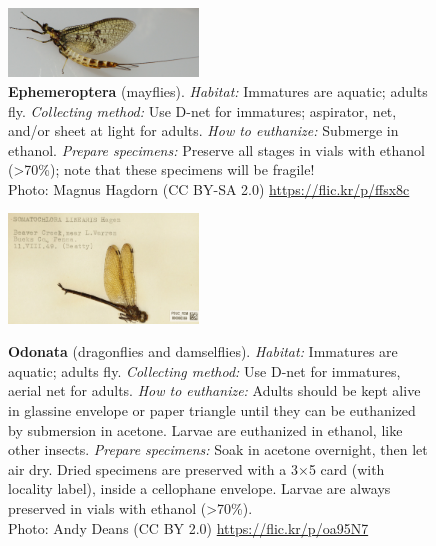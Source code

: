 \documentclass[letterpaper, 11pt]{article}
\begin{document}
\begin{figure}
  \caption*{\textbf{Ephemeroptera} (mayflies). \textit{Habitat:} Immatures are aquatic; adults fly. \textit{Collecting method:} Use D-net for immatures; aspirator, net, and/or sheet at light for adults. \textit{How to euthanize:} Submerge in ethanol. \textit{Prepare specimens:} Preserve all stages in vials with ethanol (\textgreater70\%); note that these specimens will be fragile!\\ Photo: Magnus Hagdorn (CC BY-SA 2.0) \url{https://flic.kr/p/ffsx8c}}
  \includegraphics[width=0.45\textwidth]{Ephemeroptera}
\end{figure}

\clearpage

\begin{figure}
  \caption*{\textbf{Odonata} (dragonflies and damselflies). \textit{Habitat:} Immatures are aquatic; adults fly. \textit{Collecting method:} Use D-net for immatures, aerial net for adults. \textit{How to euthanize:} Adults should be kept alive in glassine envelope or paper triangle until they can be euthanized by submersion in acetone. Larvae are euthanized in ethanol, like other insects. \textit{Prepare specimens:} Soak in acetone overnight, then let air dry. Dried specimens are preserved with a 3$\times$5 card (with locality label), inside a cellophane envelope. Larvae are always preserved in vials with ethanol (\textgreater70\%).\\ Photo: Andy Deans (CC BY 2.0) \url{https://flic.kr/p/oa95N7}}
  \includegraphics[width=0.45\textwidth]{Odonata}
  \label{odonataprep}
\end{figure}
\end{document}
